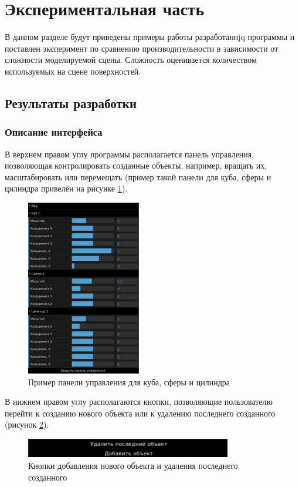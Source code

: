 \section{Экспериментальная часть}
\label{cha:research}

В данном разделе будут приведены примеры работы разработаннjq программы и поставлен эксперимент по сравнению производительности
в зависимости от сложности моделируемой сцены. Сложность оценивается количеством используемых на сцене поверхностей.

\subsection{Результаты разработки}

\subsubsection{Описание интерфейса}

В верхнем правом углу программы располагается панель управления, позволяющая контролировать созданные объекты, например, вращать их, масштабировать или перемещать (пример такой панели для куба, сферы и цилиндра привелён на рисунке \ref{fig:panel}). 
\begin{figure}[h]
	\centering
	\captionsetup{justification=centering}
	\includegraphics[width=50mm]{img/panel.png}
	\caption{Пример панели управления для куба, сферы и цилиндра}
	\label{fig:panel}
\end{figure}

В нижнем правом углу располагаются кнопки, позволяющие пользователю перейти к созданию нового объекта или к удалению последнего созданного (рисунок \ref{fig:add-buttons}).
\begin{figure}[h]
	\centering
	\captionsetup{justification=centering}
	\includegraphics[width=90mm]{img/add-buttons.png}
	\caption{Кнопки добавления нового объекта и удаления последнего созданного}
	\label{fig:add-buttons}
\end{figure}


